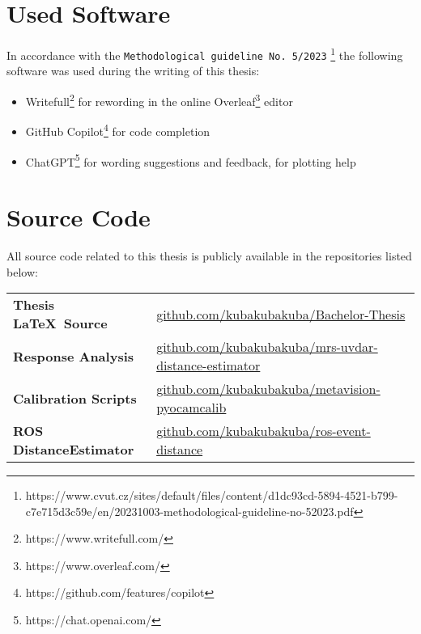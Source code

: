
\appendix
\renewcommand\chaptername{Appendix}

\renewcommand{\thechapter}{A}
\renewcommand\chaptername{Appendix A}

\chapter{Used Software}

\noindent In accordance with the \texttt{Methodological guideline No. 5/2023}
\footnote{https://www.cvut.cz/sites/default/files/content/d1dc93cd-5894-4521-b799-c7e715d3c59e/en/20231003-methodological-guideline-no-52023.pdf}
the following software was used during the writing of this thesis:
\begin{itemize}
    \item {Writefull\footnote{https://www.writefull.com/} for rewording in the online Overleaf\footnote{https://www.overleaf.com/} editor}
    \item {GitHub Copilot\footnote{https://github.com/features/copilot} for code completion}
    \item {ChatGPT\footnote{https://chat.openai.com/} for wording suggestions and feedback, for plotting help}
\end{itemize}

\renewcommand{\thechapter}{B}
\renewcommand\chaptername{Appendix B}

\chapter{Source Code}

\noindent All source code related to this thesis is publicly available in the repositories listed below:

\vspace{1em}

\renewcommand{\arraystretch}{2.2} %

\noindent
\begin{tabularx}{\textwidth}{>{\raggedright\arraybackslash}p{5cm} X}
\hline
\textbf{Thesis \LaTeX\ Source} & \href{https://github.com/kubakubakuba/Bachelor-Thesis}{github.com/kubakubakuba/Bachelor-Thesis} \\
\textbf{Response Analysis} & \href{https://github.com/kubakubakuba/mrs-uvdar-distance-estimator}{github.com/kubakubakuba/mrs-uvdar-distance-estimator} \\
\textbf{Calibration Scripts} & \href{https://github.com/kubakubakuba/metavision-pyocamcalib}{github.com/kubakubakuba/metavision-pyocamcalib} \\
\textbf{ROS DistanceEstimator} & \href{https://github.com/kubakubakuba/ros-event-distance}{github.com/kubakubakuba/ros-event-distance} \\
\hline
\end{tabularx}
